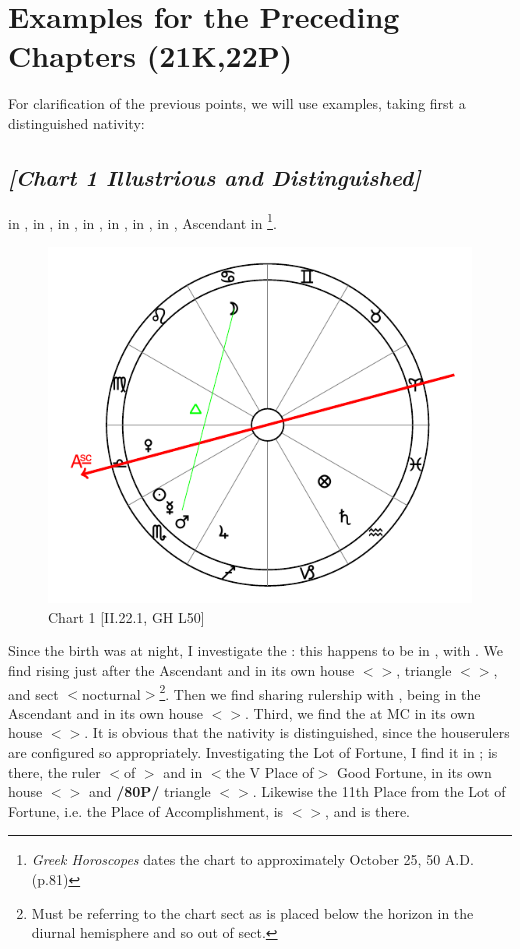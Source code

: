 \section{Examples for the Preceding Chapters (21K,22P)}
For clarification of the previous points, we will use examples, taking first a distinguished nativity:

\subsection*{\textit{[Chart 1 Illustrious and Distinguished]}}

\Sun\xspace in \Scorpio, \Moon\xspace in \Cancer, \Saturn\xspace in \Aquarius, \Jupiter\xspace in \Sagittarius, \Mars\xspace in \Scorpio, \Venus\xspace in \Libra, \Mercury\xspace in \Scorpio, Ascendant in \Libra
\footnote{\textit{Greek Horoscopes} dates the chart to approximately October 25, 50 A.D. (p.81)}. 

\clearpage
\begin{figure}
\centering
\vspace{-20pt}
\includegraphics[width=.68\textwidth]{charts/2_21_1}
\caption{Chart 1 [II.22.1, GH L50]}
\label{fig:chart01}
\end{figure}

Since the birth was at night, I investigate the \Moon: this
happens to be in \Cancer, \Trine\xspace with \Mars. We find \Mars\xspace rising just after the Ascendant and in its own
house $<$\Scorpio$>$, triangle $<$\Scorpio\xspace\Pisces\xspace \Cancer$>$, and sect $<$nocturnal$>$\footnote{Must be referring to the chart sect as \Mars\xspace is placed below the horizon in the diurnal hemisphere and so out of sect.}. Then we find \Venus\xspace sharing rulership with \Mars, being in the Ascendant and in its own house $<$\Libra$>$. Third, we find the \Moon\xspace at MC in its own house $<$\Cancer$>$. It is obvious that the nativity is distinguished, since the houserulers are configured so appropriately. Investigating the Lot of Fortune, I find it in \Aquarius; \Saturn\xspace is there, the ruler $<$of \Aquarius$>$ and in $<$the V Place of$>$ Good Fortune, in its own house $<$\Aquarius$>$ and \textbf{/80P/} triangle $<$\Aquarius\xspace \Libra\xspace \Gemini$>$. Likewise the 11th Place from the Lot of Fortune, i.e. the Place of Accomplishment, is $<$\Sagittarius$>$, and \Jupiter\xspace is there.

